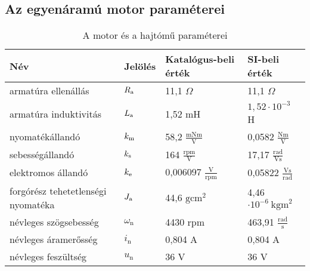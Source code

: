 \clearpage


\subsection*{Az egyenáramú motor paraméterei}

\begin{table}[H]
\begin{tabular}{llll}\toprule
Név                                & Jelölés           & Katalógus-beli érték                    & SI-beli érték                           \\ \midrule
armatúra ellenállás                & $R_\text{a}$             & 11,1 $\Omega$                           & 11,1 $\Omega$                           \\
armatúra induktivitás              & $L_\text{a}$             & 1,52 mH                                 & $1,52\cdot10^{-3}$ H                    \\
nyomatékállandó                    & $k_\text{m}$             & 58,2 $\frac{\text{mNm}}{\text{V}}$      & 0,0582 $\frac{\text{Nm}}{\text{V}}$     \\
sebességállandó                    & $k_\text{s}$             & 164 $\frac{\text{rpm}}{\text{V}}$       & 17,17 $\frac{\text{rad}}{\text{Vs}}$    \\
elektromos állandó                 & $k_\text{e}$             & 0,006097  $\frac{\text{V}}{\text{rpm}}$ & 0,05822 $\frac{\text{Vs}}{\text{rad}}$  \\
forgórész tehetetlenségi nyomatéka & $J_\text{a}$             & 44,6 $\text{gcm}^2$                     & 4,46$\cdot10^{-6}~\text{kgm}^2$         \\
névleges szögsebesség              & $\omega_\text{n}$ & 4430 rpm                                & 463,91 $\frac{\text{rad}}{\text{s}}$    \\
névleges áramerősség               & $i_\text{n}$      & 0,804 A                                 & 0,804 A                                 \\
névleges feszültség                & $u_\text{n}$      & 36 V                                    & 36 V                                    \\ \bottomrule
\end{tabular}
\caption{A motor és a hajtómű paraméterei}
\end{table}
